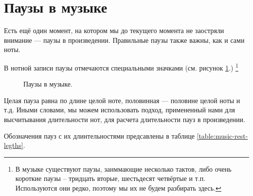 \documentclass[a4paper,twoside]{book}
\newcounter{example-counter}
\begin{document}
\section{Паузы в музыке}

Есть ещё один момент, на котором мы до текущего момента не заостряли внимание ---
паузы в произведении. Правильные паузы также важны, как и сами ноты.

В нотной записи паузы отмечаются специальными значками (см. рисунок
\ref{fig:lilypond-rest-example-1}.) \footnote{В музыке существуют паузы,
занммающие несколько тактов, либо очень короткие паузы -- тридцать вторые,
шестьдесят четвёртые и т.п. Используются они редко, поэтому мы их не будем
разбирать здесь.}

\begin{figure}[ht]
  \caption{Паузы в музыке.}
  \centering
  \label{fig:lilypond-rest-example-1}
\end{figure}

Целая пауза равна по длине целой ноте, половинная --- половине целой ноты и т.д.
Иными словами, мы можем использовать подход, примененный нами для высчитывания
длительности нот, для расчета длительности пауз в произведении.

Обозначения пауз с их длинтельностями предсавлены в таблице
\ref{table:music-rest-legths}.
\end{document}
